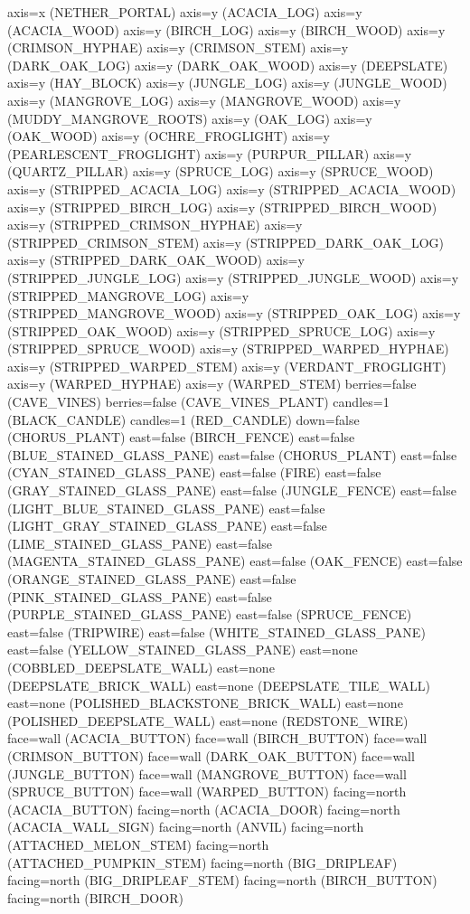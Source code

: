 \documentclass[11pt]{article}
\begin{document}
axis=x (NETHER_PORTAL)
axis=y (ACACIA_LOG)
axis=y (ACACIA_WOOD)
axis=y (BIRCH_LOG)
axis=y (BIRCH_WOOD)
axis=y (CRIMSON_HYPHAE)
axis=y (CRIMSON_STEM)
axis=y (DARK_OAK_LOG)
axis=y (DARK_OAK_WOOD)
axis=y (DEEPSLATE)
axis=y (HAY_BLOCK)
axis=y (JUNGLE_LOG)
axis=y (JUNGLE_WOOD)
axis=y (MANGROVE_LOG)
axis=y (MANGROVE_WOOD)
axis=y (MUDDY_MANGROVE_ROOTS)
axis=y (OAK_LOG)
axis=y (OAK_WOOD)
axis=y (OCHRE_FROGLIGHT)
axis=y (PEARLESCENT_FROGLIGHT)
axis=y (PURPUR_PILLAR)
axis=y (QUARTZ_PILLAR)
axis=y (SPRUCE_LOG)
axis=y (SPRUCE_WOOD)
axis=y (STRIPPED_ACACIA_LOG)
axis=y (STRIPPED_ACACIA_WOOD)
axis=y (STRIPPED_BIRCH_LOG)
axis=y (STRIPPED_BIRCH_WOOD)
axis=y (STRIPPED_CRIMSON_HYPHAE)
axis=y (STRIPPED_CRIMSON_STEM)
axis=y (STRIPPED_DARK_OAK_LOG)
axis=y (STRIPPED_DARK_OAK_WOOD)
axis=y (STRIPPED_JUNGLE_LOG)
axis=y (STRIPPED_JUNGLE_WOOD)
axis=y (STRIPPED_MANGROVE_LOG)
axis=y (STRIPPED_MANGROVE_WOOD)
axis=y (STRIPPED_OAK_LOG)
axis=y (STRIPPED_OAK_WOOD)
axis=y (STRIPPED_SPRUCE_LOG)
axis=y (STRIPPED_SPRUCE_WOOD)
axis=y (STRIPPED_WARPED_HYPHAE)
axis=y (STRIPPED_WARPED_STEM)
axis=y (VERDANT_FROGLIGHT)
axis=y (WARPED_HYPHAE)
axis=y (WARPED_STEM)
berries=false (CAVE_VINES)
berries=false (CAVE_VINES_PLANT)
candles=1 (BLACK_CANDLE)
candles=1 (RED_CANDLE)
down=false (CHORUS_PLANT)
east=false (BIRCH_FENCE)
east=false (BLUE_STAINED_GLASS_PANE)
east=false (CHORUS_PLANT)
east=false (CYAN_STAINED_GLASS_PANE)
east=false (FIRE)
east=false (GRAY_STAINED_GLASS_PANE)
east=false (JUNGLE_FENCE)
east=false (LIGHT_BLUE_STAINED_GLASS_PANE)
east=false (LIGHT_GRAY_STAINED_GLASS_PANE)
east=false (LIME_STAINED_GLASS_PANE)
east=false (MAGENTA_STAINED_GLASS_PANE)
east=false (OAK_FENCE)
east=false (ORANGE_STAINED_GLASS_PANE)
east=false (PINK_STAINED_GLASS_PANE)
east=false (PURPLE_STAINED_GLASS_PANE)
east=false (SPRUCE_FENCE)
east=false (TRIPWIRE)
east=false (WHITE_STAINED_GLASS_PANE)
east=false (YELLOW_STAINED_GLASS_PANE)
east=none (COBBLED_DEEPSLATE_WALL)
east=none (DEEPSLATE_BRICK_WALL)
east=none (DEEPSLATE_TILE_WALL)
east=none (POLISHED_BLACKSTONE_BRICK_WALL)
east=none (POLISHED_DEEPSLATE_WALL)
east=none (REDSTONE_WIRE)
face=wall (ACACIA_BUTTON)
face=wall (BIRCH_BUTTON)
face=wall (CRIMSON_BUTTON)
face=wall (DARK_OAK_BUTTON)
face=wall (JUNGLE_BUTTON)
face=wall (MANGROVE_BUTTON)
face=wall (SPRUCE_BUTTON)
face=wall (WARPED_BUTTON)
facing=north (ACACIA_BUTTON)
facing=north (ACACIA_DOOR)
facing=north (ACACIA_WALL_SIGN)
facing=north (ANVIL)
facing=north (ATTACHED_MELON_STEM)
facing=north (ATTACHED_PUMPKIN_STEM)
facing=north (BIG_DRIPLEAF)
facing=north (BIG_DRIPLEAF_STEM)
facing=north (BIRCH_BUTTON)
facing=north (BIRCH_DOOR)
\end{document}
